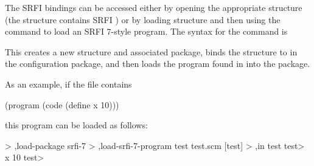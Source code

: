 The SRFI bindings can be accessed either by opening the appropriate structure
 (the structure  contains SRFI )
 or by loading structure  and then using
 the  command to load an SRFI 7-style program.
The syntax for the command is
\begin{example}
\end{example}
This creates a new structure and associated package, binds the structure
 to  in the configuration package, and then loads the program
 found in  into the package.

As an example, if the file  contains
\begin{example}
(program (code (define x 10)))
\end{example}
this program can be loaded as follows:
\begin{example}
> ,load-package srfi-7
> ,load-srfi-7-program test test.scm
[test]
> ,in test
test> x
10
test> 
\end{example}


